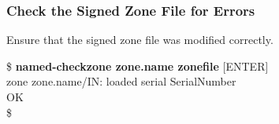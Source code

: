 
\subsubsection{Check the Signed Zone File for Errors}

Ensure that the signed zone file was modified correctly.
\begin{tabbing}
\hspace{0.5in}\$ {\bf named-checkzone zone.name zonefile} [ENTER] \\
\hspace{0.5in} zone zone.name/IN: loaded serial SerialNumber \\
\hspace{0.5in} OK \\
\hspace{0.5in}\$ \\
\end{tabbing}
